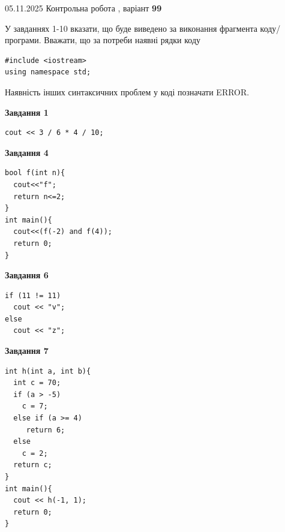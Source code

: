 \documentclass[12pt, ukrainian]{article}
\begin{document}
{\Large{05.11.2025 Контрольна робота , варіант  \No \textbf { 99 }\par}}
{
\begin {large}
У завданнях 1-10 вказати, що буде виведено за виконання фрагмента коду/про\-гра\-ми.
Вважати, що за потреби наявні рядки коду
\begin{verbatim}
#include <iostream>
using namespace std;
\end{verbatim}
Наявність інших синтаксичних проблем у коді позначати ERROR.

\begin{minipage}[t]{7.0cm}

\begin{center}
\textbf{Завдання 1}
\end{center}
\vspace{-8mm}

\begin{verbatim}
cout << 3 / 6 * 4 / 10;
\end{verbatim}



\begin{center}
\textbf{Завдання 4}
\end{center}
\vspace{-8mm}

\begin{verbatim}
bool f(int n){
  cout<<"f";
  return n<=2;
}
int main(){
  cout<<(f(-2) and f(4));
  return 0;
}
\end{verbatim}



\begin{center}
\textbf{Завдання 6}
\end{center}
\vspace{-8mm}

\begin{verbatim}
if (11 != 11)
  cout << "v";
else
  cout << "z";
\end{verbatim}



\begin{center}
\textbf{Завдання 7}
\end{center}
\vspace{-8mm}

\begin{verbatim}
int h(int a, int b){
  int c = 70;
  if (a > -5)
    c = 7;
  else if (a >= 4)
     return 6;
  else
    c = 2;
  return c;
}
int main(){
  cout << h(-1, 1);
  return 0;
}
\end{verbatim}


\end{minipage}
\end{large}}
\end{document}
